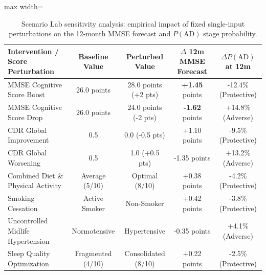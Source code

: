 \begin{table}[t]
\centering
\caption{Scenario Lab sensitivity analysis: empirical impact of fixed single-input perturbations on the 12-month MMSE forecast and $P(\text{AD})$ stage probability.}
\label{tab:scenario_sensitivity}
\small
\begin{adjustbox}{max width=\linewidth}
\begin{tabular}{lcccc}
\toprule
\textbf{Intervention / Score Perturbation} & \textbf{Baseline Value} & \textbf{Perturbed Value} & \textbf{$\Delta$ 12m MMSE Forecast} & \textbf{$\Delta P(\text{AD})$ at 12m} \\
\midrule
MMSE Cognitive Score Boost                 & 26.0 points             & 28.0 points (+2 pts)     & \textbf{+1.45} points               & -12.4\% (Protective) \\
MMSE Cognitive Score Drop                  & 26.0 points             & 24.0 points (-2 pts)     & \textbf{-1.62} points               & +14.8\% (Adverse) \\
CDR Global Improvement                     & 0.5                     & 0.0 (-0.5 pts)           & +1.10 points                        & -9.5\% (Protective) \\
CDR Global Worsening                       & 0.5                     & 1.0 (+0.5 pts)           & -1.35 points                        & +13.2\% (Adverse) \\
Combined Diet \& Physical Activity         & Average (5/10)          & Optimal (8/10)           & +0.38 points                        & -4.2\% (Protective) \\
Smoking Cessation                          & Active Smoker           & Non-Smoker               & +0.42 points                        & -3.8\% (Protective) \\
Uncontrolled Midlife Hypertension          & Normotensive            & Hypertensive             & -0.35 points                        & +4.1\% (Adverse) \\
Sleep Quality Optimization                 & Fragmented (4/10)       & Consolidated (8/10)      & +0.22 points                        & -2.5\% (Protective) \\
\bottomrule
\end{tabular}
\end{adjustbox}
\end{table}
